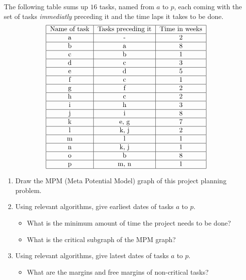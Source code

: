 \documentclass[12pt,a4paper]{article}
\begin{document}
\vspace{\baselineskip}
\begin{question}
  The following table sums up $16$ tasks, named from $a$ to $p$, each
  coming with the set of tasks \emph{immediatly} preceding it and the time
  laps it takes to be done.
  \vspace{\baselineskip}
  \begin{displaymath}
    \begin{tabular}{|c|c|c|}
      \hline
      Name of task & Tasks preceding it & Time in weeks \\
      \hline
      a  & -     & 2  \\
      \hline
      b  & a     & 8  \\      
      \hline
      c  & b     & 1  \\      
      \hline
      d  & c     & 3  \\      
      \hline
      e  & d     & 5  \\      
      \hline
      f  & c     & 1  \\      
      \hline
      g  & f     & 2  \\      
      \hline
      h  & c     & 2  \\      
      \hline
      i  & h     & 3  \\      
      \hline
      j  & i     & 8  \\      
      \hline
      k  & e, g  & 7  \\      
      \hline
      l  & k, j  & 2  \\      
      \hline
      m  & l     &  1 \\           
      \hline
      n  & k, j  & 1  \\      
      \hline
     o  & b     &  8 \\      
      \hline
      p  & m, n  & 1  \\             
      \hline
    \end{tabular}
  \end{displaymath}
  \vspace{\baselineskip}
  \begin{enumerate}
  \item Draw the MPM (Meta Potential Model) graph of this project
    planning problem.
  \item Using relevant algorithms, give earliest dates of tasks $a$ to $p$. 
    \begin{itemize}
    \item What is the minimum amount of time the project needs to be done? 
      
    \item What is the critical subgraph of the MPM graph?
    \end{itemize}
  \item Using relevant algorithms, give latest dates of tasks $a$ to $p$.
    \begin{itemize}
    \item What are the margins and free margins of non-critical tasks?
    \end{itemize}
  \end{enumerate}
\end{question}
\end{document}
